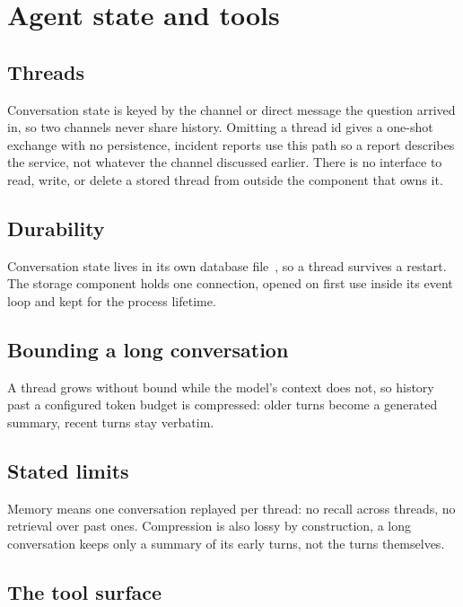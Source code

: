 \documentclass[11pt,a4paper]{article}
\let\stdsection\section
\renewcommand{\section}{\clearpage\stdsection}
\begin{document}
\section{Agent state and tools}
\label{sec:memory}

\subsection{Threads}

Conversation state is keyed by the channel or direct message the question arrived in,
so two channels never share history. Omitting a thread id gives a one-shot exchange
with no persistence, incident reports use this path so a report describes the
service, not whatever the channel discussed earlier. There is no interface to read,
write, or delete a stored thread from outside the component that owns it.

\subsection{Durability}

Conversation state lives in its own database file~\cite{sqlite}, so a thread
survives a restart. The storage component holds one connection, opened on first use
inside its event loop and kept for the process lifetime.

\subsection{Bounding a long conversation}

A thread grows without bound while the model's context does not, so history past a
configured token budget is compressed: older turns become a generated summary,
recent turns stay verbatim.

\subsection{Stated limits}

Memory means one conversation replayed per thread: no recall across threads, no
retrieval over past ones. Compression is also lossy by construction, a long
conversation keeps only a summary of its early turns, not the turns themselves.

\subsection{The tool surface}
\label{sec:tools}
\end{document}
